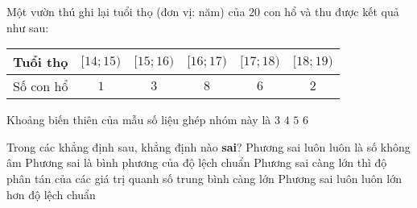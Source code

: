 \begin{ex}%
	Một vườn thú ghi lại tuổi thọ (đơn vị: năm) của $ 20 $ con hổ và thu được kết quả như sau:
	\begin{center}
		\begin{longtable}{|m{3cm}|c|c|c|c|c|}
			\hline
			Tuổi thọ  & $ [14;15) $ & $[15;16)$ & $[16;17)$ & $[17;18)$ & $[18;19)$ \\
			\hline
			Số con hổ & $ 1 $       & $ 3 $     & $ 8 $     & $ 6 $     & $ 2 $     \\
			\hline
		\end{longtable}
	\end{center}
	Khoảng biến thiên của mẫu số liệu ghép nhóm này là
	\choice
	{$ 3 $}
	{$ 4 $}
	{\True $ 5 $}
	{$ 6 $}
\end{ex}

\begin{ex}%
	Trong các khẳng định sau, khẳng định nào \textbf{sai}?
	\choice
	{Phương sai luôn luôn là số không âm}
	{Phương sai là bình phương của độ lệch chuẩn}
	{Phương sai càng lớn thì độ phân tán của các giá trị quanh số trung bình càng lớn}
	{\True Phương sai luôn luôn lớn hơn độ lệch chuẩn}
\end{ex}

